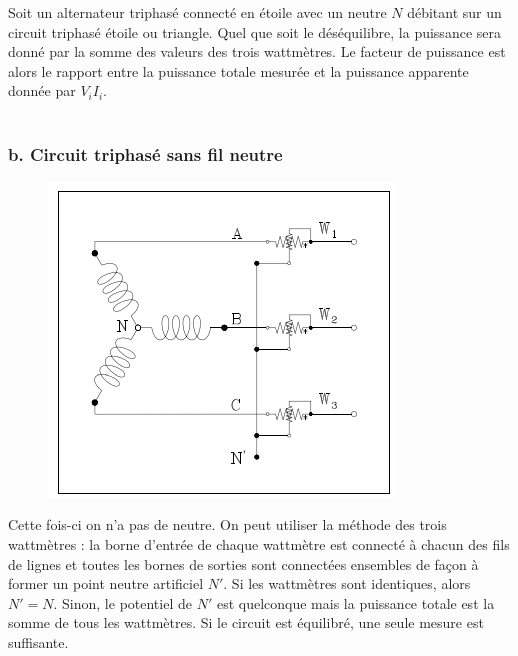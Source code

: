 		Soit un alternateur triphasé connecté en étoile avec un neutre $N$ 
		débitant sur un circuit triphasé étoile ou triangle. Quel que soit 
		le déséquilibre, la puissance sera donné par la somme des valeurs 
		des trois wattmètres. Le facteur de puissance est alors le rapport 
		entre la puissance totale mesurée et la puissance apparente donnée 
		par $V_iI_i$.\\
		\\	
		\subsubsection{b. Circuit triphasé sans fil neutre}
		\begin{figure}
		\vspace{-5mm}
		\includegraphics[scale=0.35]{ch1/image13.png}
		\end{figure}		
		Cette fois-ci on n'a pas de neutre. On peut utiliser la méthode des 
		trois wattmètres : la borne d'entrée de chaque wattmètre est connecté 
		à chacun des fils de lignes et toutes les bornes de sorties sont 
		connectées ensembles de façon à former un point neutre artificiel $N'$. 
		Si les wattmètres sont identiques, alors $N'=N$. Sinon, le potentiel 
		de $N'$ est quelconque mais la puissance totale est la somme de tous 
		les wattmètres. Si le circuit est équilibré, une seule mesure est 
		suffisante.\\
		
				
		
